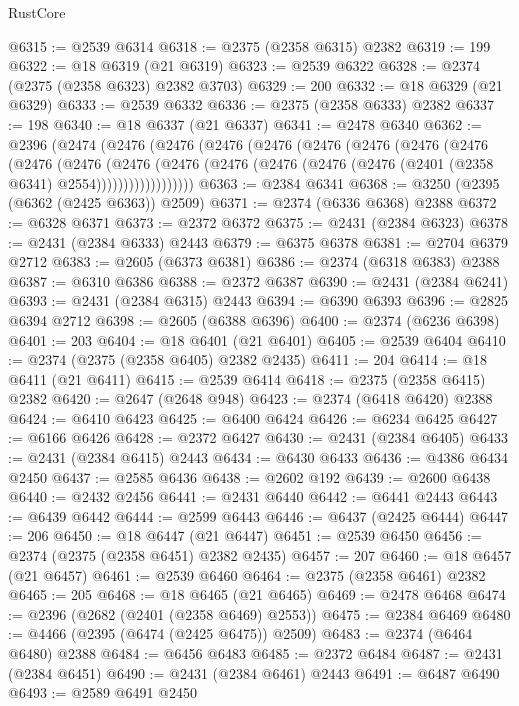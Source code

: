 \begin{lexlean}{RustCore}
\begin{coremodule}
@6315 := @2539 @6314
@6318 := @2375 (@2358 @6315) @2382
@6319 := 199
@6322 := @18 @6319 (@21 @6319)
@6323 := @2539 @6322
@6328 := @2374 (@2375 (@2358 @6323) @2382 @3703)
@6329 := 200
@6332 := @18 @6329 (@21 @6329)
@6333 := @2539 @6332
@6336 := @2375 (@2358 @6333) @2382
@6337 := 198
@6340 := @18 @6337 (@21 @6337)
@6341 := @2478 @6340
@6362 := @2396
    (@2474
      (@2476
        (@2476
          (@2476
            (@2476
              (@2476
                (@2476
                  (@2476
                    (@2476
                      (@2476
                        (@2476
                          (@2476
                            (@2476
                              (@2476
                                (@2476 (@2476 (@2476 (@2401 (@2358 @6341) @2554))))))))))))))))))
@6363 := @2384 @6341
@6368 := @3250 (@2395 (@6362 (@2425 @6363)) @2509)
@6371 := @2374 (@6336 @6368) @2388
@6372 := @6328 @6371
@6373 := @2372 @6372
@6375 := @2431 (@2384 @6323)
@6378 := @2431 (@2384 @6333) @2443
@6379 := @6375 @6378
@6381 := @2704 @6379 @2712
@6383 := @2605 (@6373 @6381)
@6386 := @2374 (@6318 @6383) @2388
@6387 := @6310 @6386
@6388 := @2372 @6387
@6390 := @2431 (@2384 @6241)
@6393 := @2431 (@2384 @6315) @2443
@6394 := @6390 @6393
@6396 := @2825 @6394 @2712
@6398 := @2605 (@6388 @6396)
@6400 := @2374 (@6236 @6398)
@6401 := 203
@6404 := @18 @6401 (@21 @6401)
@6405 := @2539 @6404
@6410 := @2374 (@2375 (@2358 @6405) @2382 @2435)
@6411 := 204
@6414 := @18 @6411 (@21 @6411)
@6415 := @2539 @6414
@6418 := @2375 (@2358 @6415) @2382
@6420 := @2647 (@2648 @948)
@6423 := @2374 (@6418 @6420) @2388
@6424 := @6410 @6423
@6425 := @6400 @6424
@6426 := @6234 @6425
@6427 := @6166 @6426
@6428 := @2372 @6427
@6430 := @2431 (@2384 @6405)
@6433 := @2431 (@2384 @6415) @2443
@6434 := @6430 @6433
@6436 := @4386 @6434 @2450
@6437 := @2585 @6436
@6438 := @2602 @192
@6439 := @2600 @6438
@6440 := @2432 @2456
@6441 := @2431 @6440
@6442 := @6441 @2443
@6443 := @6439 @6442
@6444 := @2599 @6443
@6446 := @6437 (@2425 @6444)
@6447 := 206
@6450 := @18 @6447 (@21 @6447)
@6451 := @2539 @6450
@6456 := @2374 (@2375 (@2358 @6451) @2382 @2435)
@6457 := 207
@6460 := @18 @6457 (@21 @6457)
@6461 := @2539 @6460
@6464 := @2375 (@2358 @6461) @2382
@6465 := 205
@6468 := @18 @6465 (@21 @6465)
@6469 := @2478 @6468
@6474 := @2396 (@2682 (@2401 (@2358 @6469) @2553))
@6475 := @2384 @6469
@6480 := @4466 (@2395 (@6474 (@2425 @6475)) @2509)
@6483 := @2374 (@6464 @6480) @2388
@6484 := @6456 @6483
@6485 := @2372 @6484
@6487 := @2431 (@2384 @6451)
@6490 := @2431 (@2384 @6461) @2443
@6491 := @6487 @6490
@6493 := @2589 @6491 @2450

\end{coremodule}
\end{lexlean}
